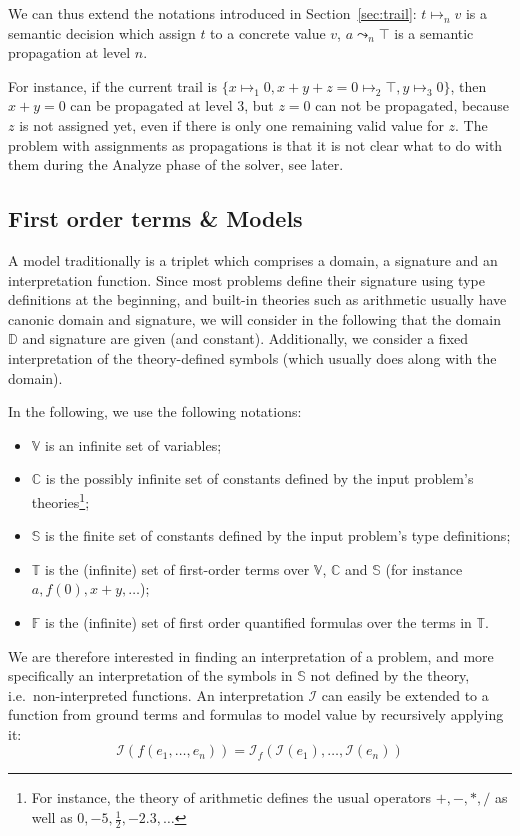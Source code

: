\documentclass{article}
\begin{document}
We can thus extend the notations introduced in Section~\ref{sec:trail}: $t \mapsto_n v$ is
a semantic decision which assign $t$ to a concrete value $v$, $a \leadsto_n \top$ is a
semantic propagation at level $n$.

For instance, if the current trail is $\{x \mapsto_1 0, x + y + z = 0 \mapsto_2 \top, y\mapsto_3 0\}$,
then $x + y = 0$ can be propagated at level $3$, but $z = 0$ can not be propagated, because
$z$ is not assigned yet, even if there is only one remaining valid value for $z$.
The problem with assignments as propagations is that it is not clear what to do with
them during the $\text{Analyze}$ phase of the solver, see later.

\subsection{First order terms \& Models}

A model traditionally is a triplet which comprises a domain, a signature and an interpretation
function. Since most problems define their signature using type definitions at the beginning, and
built-in theories such as arithmetic usually have canonic domain and signature,
we will consider in the following that the domain $\mathbb{D}$ and signature are given (and constant).
Additionally, we consider a fixed interpretation of the theory-defined symbols (which
usually does along with the domain).

In the following, we use the following notations:
\begin{itemize}
  \item $\mathbb{V}$ is an infinite set of variables;
  \item $\mathbb{C}$ is the possibly infinite set of constants defined
    by the input problem's theories\footnote{For instance, the theory of arithmetic
    defines the usual operators $+, -, *, /$ as well as $0, -5, \frac{1}{2}, -2.3, \ldots$};
  \item $\mathbb{S}$ is the finite set of constants defined by the input problem's type
    definitions;
  \item $\mathbb{T}$ is the (infinite) set of first-order terms over $\mathbb{V}$, $\mathbb{C}$
    and $\mathbb{S}$ (for instance $a, f(0), x + y, \ldots$);
  \item $\mathbb{F}$ is the (infinite) set of first order quantified formulas
    over the terms in $\mathbb{T}$.
\end{itemize}

We are therefore interested in finding an interpretation of a problem, and more
specifically an interpretation of the symbols in $\mathbb{S}$ not defined by
the theory, i.e.~non-interpreted functions. An interpretation
$\mathcal{I}$ can easily be extended to a function from ground terms and formulas
to model value by recursively applying it:
\[
  \mathcal{I}( f ( e_1, \ldots, e_n ) ) =
  \mathcal{I}_f ( \mathcal{I}(e_1), \ldots, \mathcal{I}(e_n) )
\]
\end{document}
